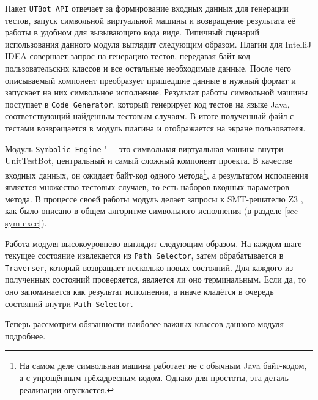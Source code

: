 Пакет \verb|UTBot API| отвечает за формирование входных данных для генерации тестов, запуск символьной виртуальной машины и возвращение результата её работы в удобном для вызывающего кода виде. Типичный сценарий использования данного модуля выглядит следующим образом. Плагин для IntelliJ IDEA совершает запрос на генерацию тестов, передавая байт-код пользовательских классов и все остальные необходимые данные. После чего описываемый компонент преобразует пришедшие данные в нужный формат и запускает на них символьное исполнение. Результат работы символьной машины поступает в \verb|Code Generator|, который генерирует код тестов на языке Java, соответствующий найденным тестовым случаям. В итоге полученный файл с тестами возвращается в модуль плагина и отображается на экране пользователя.

Модуль \verb|Symbolic Engine| "--- это символьная виртуальная машина внутри UnitTestBot, центральный и самый сложный компонент проекта. В качестве входных данных, он ожидает байт-код одного метода\footnote{На самом деле символьная машина работает не с обычным Java байт-кодом, а с упрощённым трёхадресным кодом. Однако для простоты, эта деталь реализации опускается.}, а результатом исполнения является множество тестовых случаев, то есть наборов входных параметров метода. В процессе своей работы модуль делает запросы к SMT-решателю Z3 \cite{z3}, как было описано в общем алгоритме символьного исполнения (в разделе \ref{sec-sym-exec}).

Работа модуля высокоуровнево выглядит следующим образом. На каждом шаге текущее состояние извлекается из \verb|Path Selector|, затем обрабатывается в \verb|Traverser|, который возвращает несколько новых состояний. Для каждого из полученных состояний проверяется, является ли оно терминальным. Если да, то оно запоминается как результат исполнения, а иначе кладётся в очередь состояний внутри \verb|Path Selector|. 

Теперь рассмотрим обязанности наиболее важных классов данного модуля подробнее.

